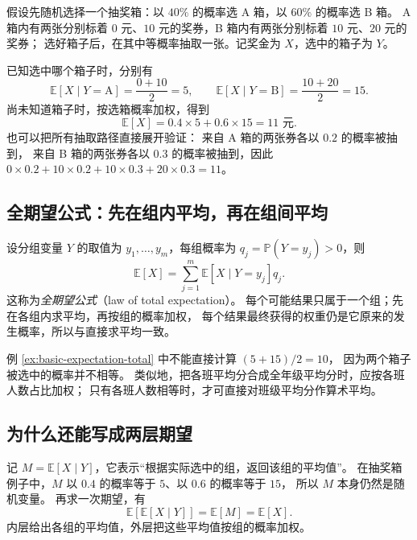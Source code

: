 \documentclass[UTF8,12pt,a4paper,fontset=fandol]{ctexart}
\begin{document}
\begin{example}
\label{ex:basic-expectation-total}
假设先随机选择一个抽奖箱：以 $40\%$ 的概率选 A 箱，以 $60\%$ 的概率选 B 箱。
A 箱内有两张分别标着 $0$ 元、$10$ 元的奖券，B 箱内有两张分别标着 $10$ 元、$20$ 元的奖券；
选好箱子后，在其中等概率抽取一张。记奖金为 $X$，选中的箱子为 $Y$。

已知选中哪个箱子时，分别有
\[
  \mathbb E[X\mid Y=\mathrm A]=\frac{0+10}{2}=5,\qquad
  \mathbb E[X\mid Y=\mathrm B]=\frac{10+20}{2}=15.
\]
尚未知道箱子时，按选箱概率加权，得到
\[
  \mathbb E[X]=0.4\times5+0.6\times15=11\text{ 元}.
\]
也可以把所有抽取路径直接展开验证：
来自 A 箱的两张券各以 $0.2$ 的概率被抽到，
来自 B 箱的两张券各以 $0.3$ 的概率被抽到，因此
$0\times0.2+10\times0.2+10\times0.3+20\times0.3=11$。
\end{example}

\subsection{全期望公式：先在组内平均，再在组间平均}

设分组变量 $Y$ 的取值为 $y_1,\ldots,y_m$，每组概率为
$q_j=\mathbb P(Y=y_j)>0$，则
\begin{equation}
  \mathbb E[X]
  =\sum_{j=1}^{m}
    \mathbb E[X\mid Y=y_j]q_j.
  \label{eq:basic-expectation-total}
\end{equation}
这称为\emph{全期望公式}（law of total expectation）。
每个可能结果只属于一个组；先在各组内求平均，再按组的概率加权，
每个结果最终获得的权重仍是它原来的发生概率，所以与直接求平均一致。

例 \ref{ex:basic-expectation-total} 中不能直接计算 $(5+15)/2=10$，
因为两个箱子被选中的概率并不相等。
类似地，把各班平均分合成全年级平均分时，应按各班人数占比加权；
只有各班人数相等时，才可直接对班级平均分作算术平均。

\subsection{为什么还能写成两层期望}

记 $M=\mathbb E[X\mid Y]$，它表示“根据实际选中的组，返回该组的平均值”。
在抽奖箱例子中，$M$ 以 $0.4$ 的概率等于 $5$、以 $0.6$ 的概率等于 $15$，
所以 $M$ 本身仍然是随机变量。
再求一次期望，有
\begin{equation}
  \mathbb E[\mathbb E[X\mid Y]]
  =\mathbb E[M]
  =\mathbb E[X].
  \label{eq:basic-expectation-tower}
\end{equation}
内层给出各组的平均值，外层把这些平均值按组的概率加权。
\end{document}
